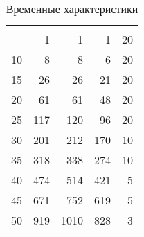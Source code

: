 \begin{table}[ht]
	\small
	\begin{center}
		\begin{threeparttable}
			
			\caption{Временные характеристики}
			\label{tbl:time_algo}
			\begin{tabular}{|p{}|p{0.15\textwidth}|p{}|p{}|p{}| }
				\hline
				\centering{Размер, элементы} & \centering{Стандартный алгоритм, мс} & \centering{Алгоритм Винограда, мс} & \centering{Оптимизированный алгоритм Винограда, мс} & \centering{Количество замеров} \\
				\cr
				\hline
				\multicolumn{1}{|r|}{5}& \multicolumn{1}{|r|}{1} & \multicolumn{1}{|r|}{1} & \multicolumn{1}{|r|}{1} & \multicolumn{1}{|r|}{20} \\
				\hline
				\multicolumn{1}{|r|}{10} & \multicolumn{1}{|r|}{8} & \multicolumn{1}{|r|}{8} & \multicolumn{1}{|r|}{6} & \multicolumn{1}{|r|}{20} \\
				\hline
				\multicolumn{1}{|r|}{15} & \multicolumn{1}{|r|}{26} & \multicolumn{1}{|r|}{26} & \multicolumn{1}{|r|}{21} & \multicolumn{1}{|r|}{20} \\
				\hline
				\multicolumn{1}{|r|}{20} & \multicolumn{1}{|r|}{61} & \multicolumn{1}{|r|}{61} & \multicolumn{1}{|r|}{48} & \multicolumn{1}{|r|}{20} \\
				\hline
				\multicolumn{1}{|r|}{25} & \multicolumn{1}{|r|}{117} & \multicolumn{1}{|r|}{120} & \multicolumn{1}{|r|}{96} & \multicolumn{1}{|r|}{20} \\
				\hline
				\multicolumn{1}{|r|}{30} & \multicolumn{1}{|r|}{201} & \multicolumn{1}{|r|}{212} & \multicolumn{1}{|r|}{170} & \multicolumn{1}{|r|}{10} \\
				\hline
				\multicolumn{1}{|r|}{35} & \multicolumn{1}{|r|}{318} & \multicolumn{1}{|r|}{338} & \multicolumn{1}{|r|}{274} & \multicolumn{1}{|r|}{10} \\
				\hline
				\multicolumn{1}{|r|}{40} & \multicolumn{1}{|r|}{474} & \multicolumn{1}{|r|}{514} & \multicolumn{1}{|r|}{421} & \multicolumn{1}{|r|}{5} \\
				\hline
				\multicolumn{1}{|r|}{45} & \multicolumn{1}{|r|}{671} & \multicolumn{1}{|r|}{752} & \multicolumn{1}{|r|}{619} & \multicolumn{1}{|r|}{5} \\
				\hline
				\multicolumn{1}{|r|}{50} & \multicolumn{1}{|r|}{919} & \multicolumn{1}{|r|}{1010} & \multicolumn{1}{|r|}{828} & \multicolumn{1}{|r|}{3} \\
				\hline
			\end{tabular}	
		\end{threeparttable}
	\end{center}
\end{table}

